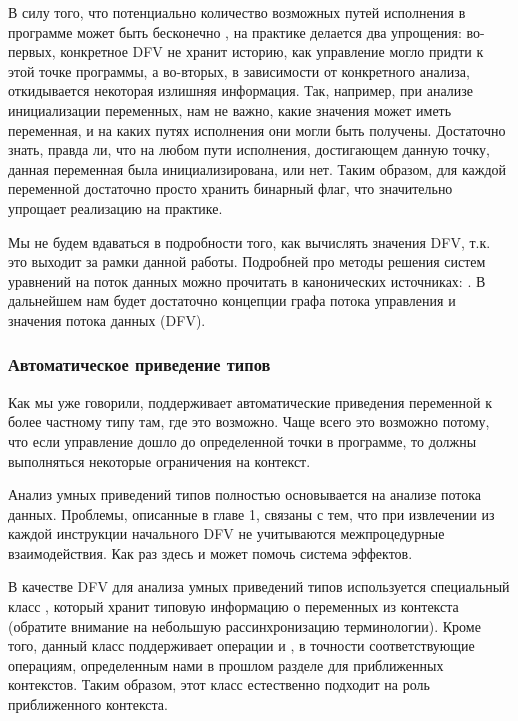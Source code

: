 В силу того, что потенциально количество возможных путей исполнения в программе может быть бесконечно \cite{dragon-book}, на практике делается два упрощения: во-первых, конкретное DFV не хранит историю, как управление могло придти к этой точке программы, а во-вторых, в зависимости от конкретного анализа, откидывается некоторая излишняя информация. Так, например, при анализе инициализации переменных, нам не важно, какие значения может иметь переменная, и на каких путях исполнения они могли быть получены. Достаточно знать, правда ли, что на любом пути исполнения, достигающем данную точку, данная переменная была инициализирована, или нет. Таким образом, для каждой переменной достаточно просто хранить бинарный флаг, что значительно упрощает реализацию на практике.

Мы не будем вдаваться в подробности того, как вычислять значения DFV, т.к. это выходит за рамки данной работы. Подробней про методы решения систем уравнений на поток данных можно прочитать в канонических источниках: \cite{dragon-book, muchnick}. В дальнейшем нам будет достаточно концепции графа потока управления и значения потока данных (DFV).

\subsubsection{Автоматическое приведение типов}

\label{section-upgrading-smartcasts}

Как мы уже говорили,  поддерживает автоматические приведения переменной к более частному типу там, где это возможно. Чаще всего это возможно потому, что если управление дошло до определенной точки в программе, то должны выполняться некоторые ограничения на контекст.

Анализ умных приведений типов полностью основывается на анализе потока данных. Проблемы, описанные в главе 1, связаны с тем, что при извлечении из каждой инструкции начального DFV не учитываются межпроцедурные взаимодействия. Как раз здесь и может помочь система эффектов.

В качестве DFV для анализа умных приведений типов используется специальный класс , который хранит типовую информацию о переменных из контекста (обратите внимание на небольшую рассинхронизацию терминологии). Кроме того, данный класс поддерживает операции  и , в точности соответствующие операциям, определенным нами в прошлом разделе для приближенных контекстов. Таким образом, этот класс естественно подходит на роль приближенного контекста.

